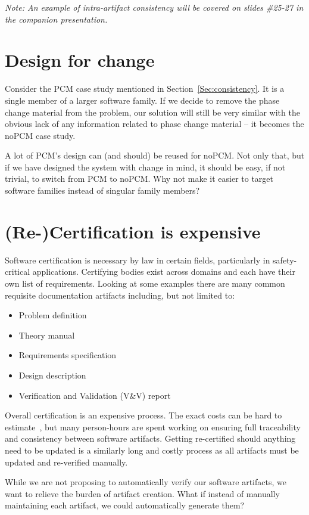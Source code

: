 \documentclass[twocolumn]{article}
\begin{document}
\emph{Note: An example of intra-artifact consistency will be covered on slides 
\#25-27 in the companion presentation.}

\section{Design for change}

Consider the PCM case study mentioned in Section~\ref{Sec:consistency}. It is a 
single member of a larger software family. If we decide to remove the phase 
change material from the problem, our solution will still be very similar with 
the obvious lack of any information related to phase change material -- it 
becomes the noPCM case study.

A lot of PCM's design can (and should) be reused for noPCM. Not only that, but 
if we have designed the system with change in mind, it should be easy, if not 
trivial, to switch from PCM to noPCM. Why not make it easier to target software 
families instead of singular family members?

\section{(Re-)Certification is expensive}

Software certification is necessary by law in certain fields, particularly in 
safety-critical applications. Certifying bodies exist across domains 
and each have their own list of requirements. Looking at some 
examples \cite{CDRH2002,CSA1999,CSA2009,FDA2014} there are many common  
requisite documentation artifacts including, but not limited to:

\begin{itemize}
\itemsep-.2em
\item Problem definition
\item Theory manual
\item Requirements specification
\item Design description
\item Verification and Validation (V\&V) report
\end{itemize}

Overall certification is an expensive process. The exact costs can be hard to 
estimate~\cite{HatcliffEtAl2009}, but many person-hours are spent 
working on ensuring full traceability and consistency between software 
artifacts. Getting re-certified should anything need to be updated is a 
similarly long and costly process as all artifacts must be updated and 
re-verified manually.

While we are not proposing to automatically verify our software artifacts, we 
want to relieve the burden of artifact creation. What if instead of manually 
maintaining each artifact, we could automatically generate them? 


  
\end{document}
